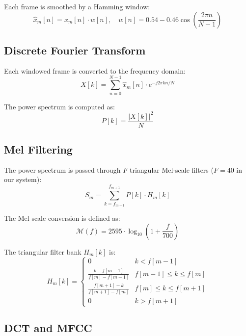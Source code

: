 \documentclass[12pt,a4paper]{report}
\begin{document}
Each frame is smoothed by a Hamming window:
\begin{equation}
    \hat{x}_m[n] = x_m[n] \cdot w[n], \quad
    w[n] = 0.54 - 0.46 \cos\left(\frac{2\pi n}{N-1}\right)
\end{equation}

\subsection{Discrete Fourier Transform}

Each windowed frame is converted to the frequency domain:
\begin{equation}
    X[k] = \sum_{n=0}^{N-1} \hat{x}_m[n] \cdot e^{-j2\pi kn/N}
\end{equation}

The power spectrum is computed as:
\begin{equation}
    P[k] = \frac{|X[k]|^2}{N}
\end{equation}

\subsection{Mel Filtering}

The power spectrum is passed through $F$ triangular Mel-scale filters
($F = 40$ in our system):
\begin{equation}
    S_m = \sum_{k=f_{m-1}}^{f_{m+1}} P[k] \cdot H_m[k]
\end{equation}

The Mel scale conversion is defined as:
\begin{equation}
    \mathcal{M}(f) = 2595 \cdot \log_{10}\left(1 + \frac{f}{700}\right)
    \label{eq:mel}
\end{equation}

The triangular filter bank $H_m[k]$ is:
\begin{equation}
    H_m[k] = \begin{cases}
        0 & k < f[m-1] \\
        \frac{k - f[m-1]}{f[m] - f[m-1]} & f[m-1] \leq k \leq f[m] \\
        \frac{f[m+1] - k}{f[m+1] - f[m]} & f[m] \leq k \leq f[m+1] \\
        0 & k > f[m+1]
    \end{cases}
\end{equation}

\subsection{DCT and MFCC}
\end{document}
